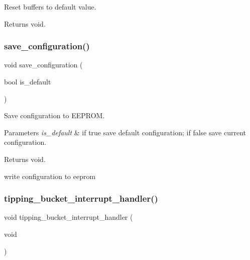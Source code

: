 Reset buffers to default value. 

\begin{DoxyReturn}{Returns}
void. 
\end{DoxyReturn}
\mbox{\label{i2c-rain_8h_a8801fa7c9f323c5b8b9b2bb5b1c438ff}} 
\subsubsection{\texorpdfstring{save\+\_\+configuration()}{save\_configuration()}}
{\footnotesize\ttfamily void save\+\_\+configuration (\begin{DoxyParamCaption}\item[{bool}]{is\+\_\+default }\end{DoxyParamCaption})}



Save configuration to E\+E\+P\+R\+OM. 


\begin{DoxyParams}{Parameters}
{\em is\+\_\+default} & if true save default configuration; if false save current configuration. \\
\hline
\end{DoxyParams}
\begin{DoxyReturn}{Returns}
void. 
\end{DoxyReturn}
write configuration to eeprom \mbox{\label{i2c-rain_8h_a7fcfeb4fd75663ddccc79030c37d68b9}} 
\subsubsection{\texorpdfstring{tipping\+\_\+bucket\+\_\+interrupt\+\_\+handler()}{tipping\_bucket\_interrupt\_handler()}}
{\footnotesize\ttfamily void tipping\+\_\+bucket\+\_\+interrupt\+\_\+handler (\begin{DoxyParamCaption}\item[{void}]{ }\end{DoxyParamCaption})}



